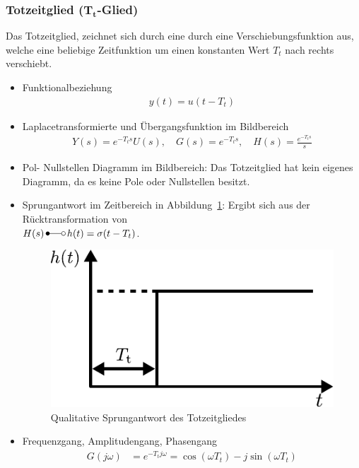 \subsubsection{Totzeitglied (T$_{\boldsymbol{t}}$-Glied)}
%
Das Totzeitglied, zeichnet sich durch eine durch eine Verschiebungsfunktion aus, welche eine beliebige Zeitfunktion um einen konstanten Wert $T_{t}$ nach rechts verschiebt.
%
\begin{itemize}
	\item Funktionalbeziehung
	\begin{equation*}
	\begin{aligned}
	y(t)=u(t-T_{t})
	\end{aligned}
	\end{equation*}
	\item Laplacetransformierte und Übergangsfunktion im Bildbereich
	\begin{equation*}
	\begin{aligned}
	Y(s)=e^{-T_{t}s}U(s),\quad G(s)=e^{-T_{t}s},\quad H(s)=\frac{e^{-T_{t}s}}{s}
	\end{aligned}
	\end{equation*}
	\item Pol- Nullstellen Diagramm im Bildbereich: Das Totzeitglied hat kein eigenes Diagramm, da es keine Pole oder Nullstellen besitzt.
	\item Sprungantwort im Zeitbereich in Abbildung~\ref{fig:tgliedsprung}: Ergibt sich aus der Rücktransformation von \\$H(s) \,\Laplace\, h(t)=\sigma(t-T_{t})$.
	\begin{figure}[h]
		\centering
		\includegraphics[width=0.4\linewidth]{Abbildungen/Modellbildung/PDF/TgliedSprung.pdf}
		\caption{Qualitative Sprungantwort des Totzeitgliedes}
		\label{fig:tgliedsprung}
	\end{figure}
	\item Frequenzgang, Amplitudengang, Phasengang
	\begin{equation*}
	\begin{aligned}
	G(j\omega)&=e^{-T_{t}j\omega}=\cos(\omega T_{t})-j\sin(\omega T_{t})\\

\end{aligned}
\end{equation*}
\end{itemize}
